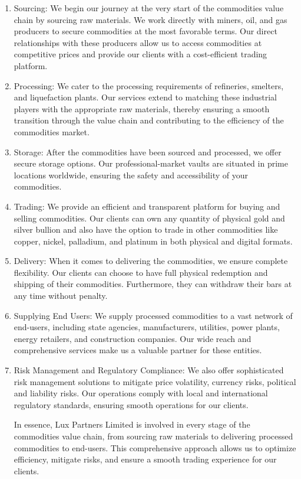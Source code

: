 \documentclass[11pt]{article}
\begin{document}
\begin{enumerate}
  \item Sourcing: We begin our journey at the very start of the commodities value chain by sourcing raw materials. We work directly with miners, oil, and gas producers to secure commodities at the most favorable terms. Our direct relationships with these producers allow us to access commodities at competitive prices and provide our clients with a cost-efficient trading platform.
  \item Processing: We cater to the processing requirements of refineries, smelters, and liquefaction plants. Our services extend to matching these industrial players with the appropriate raw materials, thereby ensuring a smooth transition through the value chain and contributing to the efficiency of the commodities market.
  \item Storage: After the commodities have been sourced and processed, we offer secure storage options. Our professional-market vaults are situated in prime locations worldwide, ensuring the safety and accessibility of your commodities.
  \item Trading: We provide an efficient and transparent platform for buying and selling commodities. Our clients can own any quantity of physical gold and silver bullion and also have the option to trade in other commodities like copper, nickel, palladium, and platinum in both physical and digital formats.
  \item Delivery: When it comes to delivering the commodities, we ensure complete flexibility. Our clients can choose to have full physical redemption and shipping of their commodities. Furthermore, they can withdraw their bars at any time without penalty.
  \item Supplying End Users: We supply processed commodities to a vast network of end-users, including state agencies, manufacturers, utilities, power plants, energy retailers, and construction companies. Our wide reach and comprehensive services make us a valuable partner for these entities.
  \item Risk Management and Regulatory Compliance: We also offer sophisticated risk management solutions to mitigate price volatility, currency risks, political and liability risks. Our operations comply with local and international regulatory standards, ensuring smooth operations for our clients.

In essence, Lux Partners Limited is involved in every stage of the commodities value chain, from sourcing raw materials to delivering processed commodities to end-users. This comprehensive approach allows us to optimize efficiency, mitigate risks, and ensure a smooth trading experience for our clients.

\end{enumerate}
\end{document}
